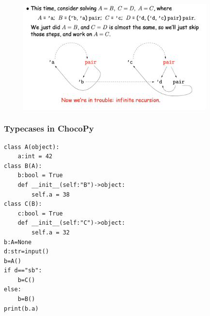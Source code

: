 \documentclass[a4paper]{exam}
\begin{document}
\begin{figure}[htbp]
  \centering
  \includegraphics[width=10cm]{./img/recursive_type.png}
\end{figure}
  \subsubsection{Typecases in ChocoPy}
\begin{verbatim}
class A(object):
    a:int = 42
class B(A):
    b:bool = True
    def __init__(self:"B")->object:
        self.a = 38
class C(B):
    c:bool = True
    def __init__(self:"C")->object:
        self.a = 32
b:A=None
d:str=input()
b=A()
if d=="sb":
    b=C()
else:
    b=B()
print(b.a)
\end{verbatim}
\printbibliography
\end{document}
